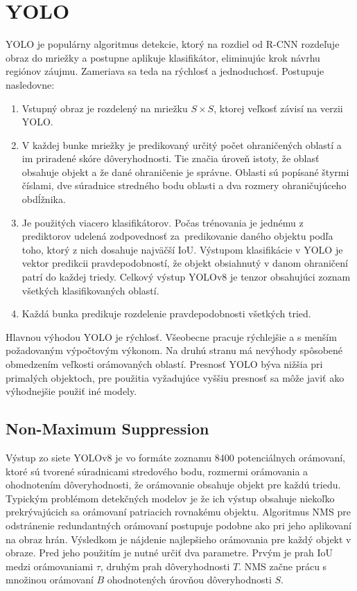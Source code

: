     \section{YOLO}
        \ac{YOLO} je populárny algoritmus detekcie, ktorý na rozdiel od \ac{R-CNN} rozdeľuje obraz do mriežky a postupne aplikuje klasifikátor, eliminujúc krok návrhu regiónov záujmu. Zameriava sa teda na rýchlosť a jednoduchosť. Postupuje nasledovne:

        \begin{enumerate}
            \item Vstupný obraz je rozdelený na mriežku $S \times S$, ktorej veľkosť závisí na verzii \ac{YOLO}.
            \item V každej bunke mriežky je predikovaný určitý počet ohraničených oblastí a im priradené skóre dôveryhodnosti. Tie značia úroveň istoty, že oblasť obsahuje objekt a že dané ohraničenie je správne. Oblasti sú popísané štyrmi číslami, dve súradnice stredného bodu oblasti a dva rozmery ohraničujúceho obdĺžnika.
            \item Je použitých viacero klasifikátorov. Počas trénovania je jednému z prediktorov udelená zodpovednosť za~predikovanie daného objektu podľa toho, ktorý z nich dosahuje najväčší \ac{IoU}. Výstupom klasifikácie v \ac{YOLO} je vektor predikcii pravdepodobností, že objekt obsiahnutý v danom ohraničení patrí do každej triedy. Celkový výstup YOLOv8 je tenzor obsahujúci zoznam všetkých klasifikovaných oblastí.
            \item Každá bunka predikuje rozdelenie pravdepodobnosti všetkých tried.
        \end{enumerate}

        Hlavnou výhodou \ac{YOLO} je rýchlosť. Všeobecne pracuje rýchlejšie a s menším požadovaným výpočtovým výkonom. Na druhú stranu má nevýhody spôsobené obmedzením veľkosti orámovaných oblastí. Presnosť \ac{YOLO} býva nižšia pri primalých objektoch, pre použitia vyžadujúce vyššiu presnosť sa môže javiť ako výhodnejšie použiť iné modely.

        \subsection{Non-Maximum Suppression}
            Výstup zo siete YOLOv8 je vo formáte zoznamu 8400 potenciálnych orámovaní, ktoré sú tvorené súradnicami stredového bodu, rozmermi orámovania a ohodnotením dôveryhodnosti, že orámovanie obsahuje objekt pre každú triedu. Typickým problémom detekčných modelov je že ich výstup obsahuje niekoľko prekrývajúcich sa orámovaní patriacich rovnakému objektu. Algoritmus \ac{NMS} pre odstránenie redundantných orámovaní postupuje podobne ako pri jeho aplikovaní na obraz hrán. Výsledkom je nájdenie najlepšieho orámovania pre každý objekt v obraze. Pred jeho použitím je nutné určiť dva parametre. Prvým je prah \ac{IoU} medzi orámovaniami $\tau$, druhým prah dôveryhodnosti $T$. \ac{NMS} začne prácu s množinou orámovaní $B$ ohodnotených úrovňou dôveryhodnosti $S$.

